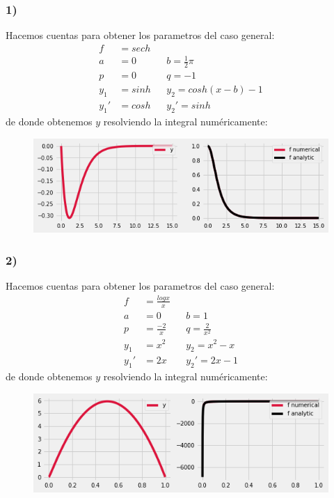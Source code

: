 \documentclass{article}
\begin{document}
\begin{tcolorbox}
    \subsubsection*{1)}
    Hacemos cuentas para obtener los parametros del caso general:
    \begin{align*}
        f&= sech \\
        a&=0 &&b=\frac{1}{2}\pi \\
        p&=0 &&q=-1 \\
        y_1 &= sinh  &&y_2= cosh(x-b)-1 \\
        y_1' &= cosh &&y_2'=sinh 
    \end{align*}
    de donde obtenemos $y$ resolviendo la integral numéricamente:
    \begin{figure}[H]
        \centering
        \includegraphics[scale=0.7]{images/p3_1.png}
    \end{figure}

    \subsubsection*{2)}
    Hacemos cuentas para obtener los parametros del caso general:
    \begin{align*}
        f&= \frac{logx}{x} \\
        a&=0 &&b=1 \\
        p&=\frac{-2}{x} &&q= \frac{2}{x^2} \\
        y_1 &= x^2  &&y_2= x^2-x \\
        y_1' &= 2x &&y_2'= 2x-1 
    \end{align*}
    de donde obtenemos $y$ resolviendo la integral numéricamente:
    \begin{figure}[H]
        \centering
        \includegraphics[scale=0.7]{images/p3_2.png}
    \end{figure}
\end{tcolorbox}
\end{document}
